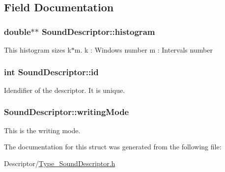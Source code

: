 \subsection{Field Documentation}
\hypertarget{structSoundDescriptor_a677e9fb3556058648bf4f114e81abc8f}{
\subsubsection[{histogram}]{\setlength{\rightskip}{0pt plus 5cm}double$\ast$$\ast$ Sound\-Descriptor\-::histogram}}\label{structSoundDescriptor_a677e9fb3556058648bf4f114e81abc8f}
This histogram sizes k$\ast$m. k \-: Windows number m \-: Intervals number \hypertarget{structSoundDescriptor_a0e74167c9c85b5696a4b64dd16af30c6}{
\subsubsection[{id}]{\setlength{\rightskip}{0pt plus 5cm}int Sound\-Descriptor\-::id}}\label{structSoundDescriptor_a0e74167c9c85b5696a4b64dd16af30c6}
Idendifier of the descriptor. It is unique. \hypertarget{structSoundDescriptor_a6bda0da57e7a82c0e7c20b22f26b6c1c}{
\subsubsection[{writing\-Mode}]{ Sound\-Descriptor\-::writing\-Mode}}\label{structSoundDescriptor_a6bda0da57e7a82c0e7c20b22f26b6c1c}
This is the writing mode. 

The documentation for this struct was generated from the following file\-:\begin{DoxyCompactItemize}
\item 
Descriptor/\hyperlink{Type__SoundDescriptor_8h}{Type\-\_\-\-Sound\-Descriptor.\-h}\end{DoxyCompactItemize}
